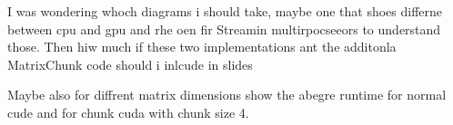 I was wondering whoch diagrams i should take, maybe one that shoes differne between cpu and gpu and rhe oen fir Streamin multirpocseeors to understand those.
Then hiw much if these two implementations ant the additonla MatrixChunk code should i inlcude in slides

Maybe also for diffrent matrix dimensions show the abegre runtime for normal cude and for chunk cuda with chunk size 4. 